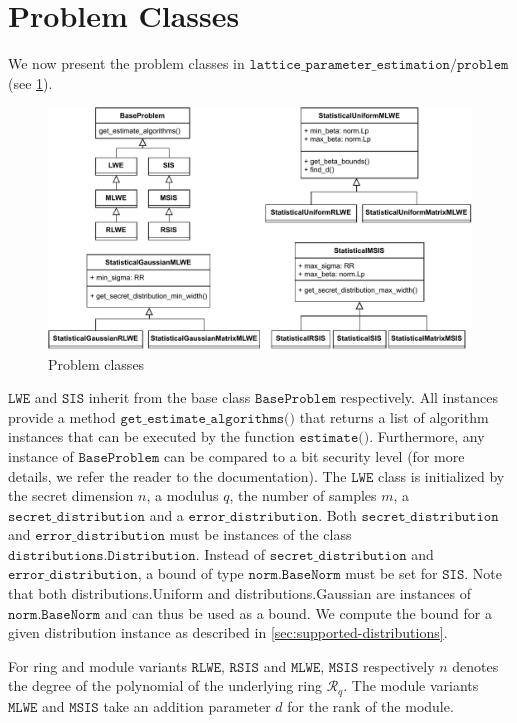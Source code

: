 \section{Problem Classes}
We now present the problem classes in $\texttt{lattice\_parameter\_estimation/problem}$ (see \cref{fig:problem-classes}).

\begin{figure}[h]
    \centering
    \includegraphics[width=1\textwidth]{graphics/problem_classes.pdf}
    \caption{Problem classes}\label{fig:problem-classes}
\end{figure}

$\texttt{LWE}$ and $\texttt{SIS}$ inherit from the base class $\texttt{BaseProblem}$ respectively. All instances provide a method $\texttt{get\_estimate\_algorithms()}$ that returns a list of algorithm instances that can be executed by the function $\texttt{estimate()}$. Furthermore, any instance of $\texttt{BaseProblem}$ can be compared to a bit security level (for more details, we refer the reader to the documentation). The $\texttt{LWE}$ class is initialized by the secret dimension $n$, a modulus $q$, the number of samples $m$, a $\texttt{secret\_distribution}$ and a $\texttt{error\_distribution}$. Both $\texttt{secret\_distribution}$ and $\texttt{error\_distribution}$ must be instances of the class $\texttt{distributions.Distribution}$. Instead of $\texttt{secret\_distribution}$ and $\texttt{error\_distribution}$, a bound of type $\texttt{norm.BaseNorm}$ must be set for $\texttt{SIS}$. Note that both {distributions.Uniform} and {distributions.Gaussian} are instances of $\texttt{norm.BaseNorm}$ and can thus be used as a bound. We compute the bound for a given distribution instance as described in \cref{sec:supported-distributions}.

For ring and module variants $\texttt{RLWE}$, $\texttt{RSIS}$ and $\texttt{MLWE}$, $\texttt{MSIS}$ respectively $n$ denotes the degree of the polynomial of the underlying ring $\mathcal{R}_q$. The module variants $\texttt{MLWE}$ and $\texttt{MSIS}$ take an addition parameter $d$ for the rank of the module.

